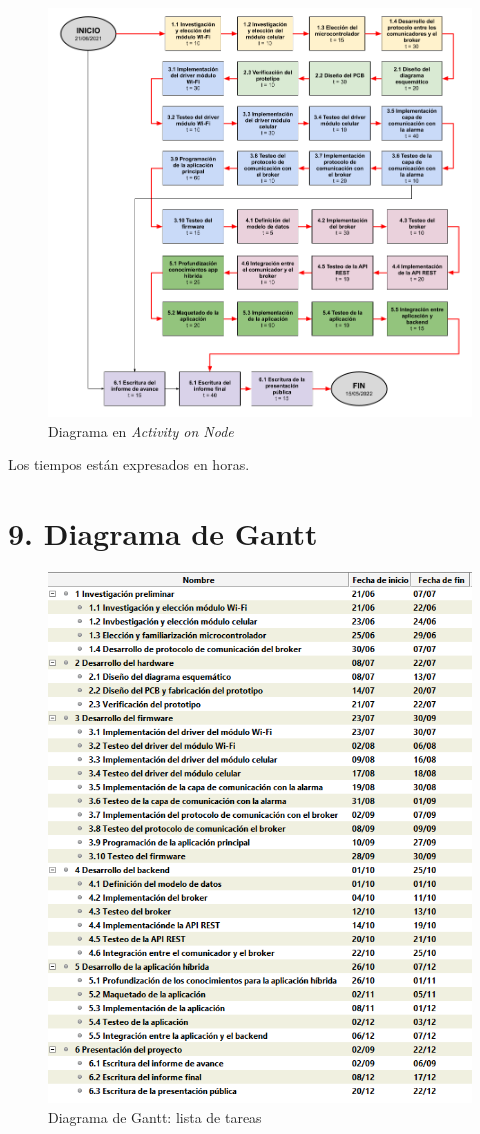 \documentclass[
11pt, %
codirector, %
]{charter}
\begin{document}
\begin{figure}[htpb]
\centering 
\includegraphics[width=\textwidth]{./Figuras/AoN.png}
\caption{Diagrama en \textit{Activity on Node}}
\label{fig:AoN}
\end{figure}

Los tiempos están expresados en horas.



\section{9. Diagrama de Gantt}
\label{sec:gantt}


\begin{figure}[htpb]
\centering 
\includegraphics[width=.75\textwidth]{./Figuras/gantt1.png}
\caption{Diagrama de Gantt: lista de tareas}
\label{fig:gantt1}
\end{figure}
\end{document}
